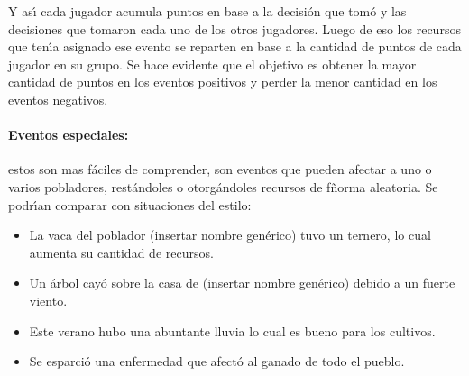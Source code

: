 \documentclass{article}
\begin{document}
Y as\'{\i} cada jugador acumula puntos en base a la decisi\'on que tom\'o y las decisiones que tomaron cada uno de los otros jugadores.
Luego de eso los recursos que ten\'{\i}a asignado ese evento se reparten en base a la cantidad de puntos de cada jugador en su grupo.
Se hace evidente que el objetivo es obtener la mayor cantidad de puntos en los eventos positivos y perder la menor cantidad en los eventos
negativos.

\paragraph*{Eventos especiales: } estos son mas f\'aciles de comprender, son eventos que pueden afectar a uno o varios pobladores, rest\'andoles
o otorg\'andoles recursos de fñorma aleatoria. Se podr\'{\i}an comparar con situaciones del estilo:
\begin{itemize}
    \item La vaca del poblador (insertar nombre gen\'erico) tuvo un ternero, lo cual aumenta su cantidad de recursos.
    \item Un \'arbol cay\'o sobre la casa de (insertar nombre gen\'erico) debido a un fuerte viento.
    \item Este verano hubo una abuntante lluvia lo cual es bueno para los cultivos.
    \item Se esparci\'o una enfermedad que afect\'o al ganado de todo el pueblo.
\end{itemize}
\end{document}
